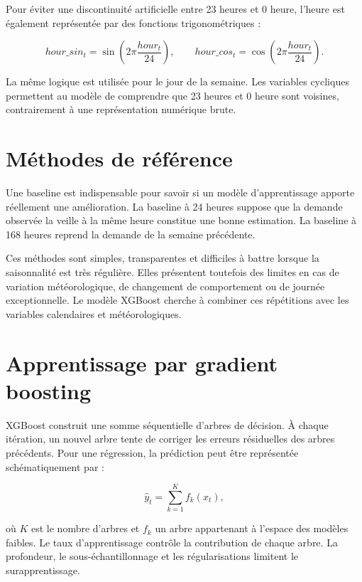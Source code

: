 \documentclass[12pt,a4paper]{report}
\begin{document}
Pour éviter une discontinuité artificielle entre 23 heures et 0 heure, l'heure
est également représentée par des fonctions trigonométriques :

\begin{equation}
hour\_sin_t = \sin\left(2\pi \frac{hour_t}{24}\right),
\qquad
hour\_cos_t = \cos\left(2\pi \frac{hour_t}{24}\right).
\end{equation}

La même logique est utilisée pour le jour de la semaine. Les variables
cycliques permettent au modèle de comprendre que 23 heures et 0 heure sont
voisines, contrairement à une représentation numérique brute.

\section{Méthodes de référence}

Une baseline est indispensable pour savoir si un modèle d'apprentissage
apporte réellement une amélioration. La baseline à 24 heures suppose que la
demande observée la veille à la même heure constitue une bonne estimation. La
baseline à 168 heures reprend la demande de la semaine précédente.

Ces méthodes sont simples, transparentes et difficiles à battre lorsque la
saisonnalité est très régulière. Elles présentent toutefois des limites en
cas de variation météorologique, de changement de comportement ou de journée
exceptionnelle. Le modèle XGBoost cherche à combiner ces répétitions avec les
variables calendaires et météorologiques.

\section{Apprentissage par gradient boosting}

XGBoost construit une somme séquentielle d'arbres de décision. À chaque
itération, un nouvel arbre tente de corriger les erreurs résiduelles des
arbres précédents. Pour une régression, la prédiction peut être représentée
schématiquement par :

\begin{equation}
\hat{y}_t = \sum_{k=1}^{K} f_k(x_t),
\end{equation}

où $K$ est le nombre d'arbres et $f_k$ un arbre appartenant à l'espace des
modèles faibles. Le taux d'apprentissage contrôle la contribution de chaque
arbre. La profondeur, le sous-échantillonnage et les régularisations limitent
le surapprentissage.
\end{document}
